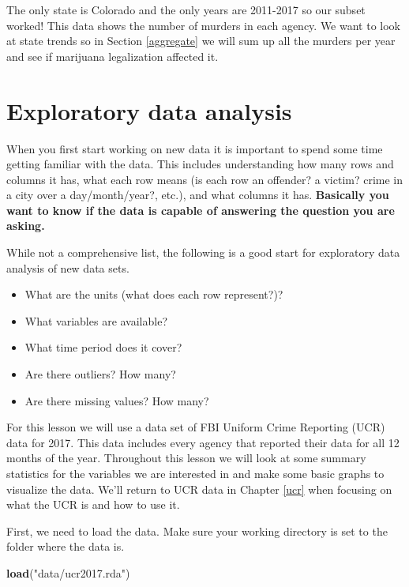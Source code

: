 \documentclass[
  12pt,
]{book}
\newenvironment{Shaded}{\begin{snugshade}}{\end{snugshade}}
\newcommand{\KeywordTok}[1]{\textcolor[rgb]{0.27,0.27,0.27}{\textbf{#1}}}
\newcommand{\NormalTok}[1]{#1}
\newcommand{\StringTok}[1]{\textcolor[rgb]{0.5,0.5,0.5}{#1}}
\providecommand{\tightlist}{%
  \setlength{\itemsep}{0pt}\setlength{\parskip}{0pt}}
\begin{document}
The only state is Colorado and the only years are 2011-2017 so our subset worked! This data shows the number of murders in each agency. We want to look at state trends so in Section \ref{aggregate} we will sum up all the murders per year and see if marijuana legalization affected it.

\hypertarget{explore}{%
\chapter{Exploratory data analysis}\label{explore}}

When you first start working on new data it is important to spend some time getting familiar with the data. This includes understanding how many rows and columns it has, what each row means (is each row an offender? a victim? crime in a city over a day/month/year?, etc.), and what columns it has. \textbf{Basically you want to know if the data is capable of answering the question you are asking.}

While not a comprehensive list, the following is a good start for exploratory data analysis of new data sets.

\begin{itemize}
\tightlist
\item
  What are the units (what does each row represent?)?
\item
  What variables are available?
\item
  What time period does it cover?
\item
  Are there outliers? How many?
\item
  Are there missing values? How many?
\end{itemize}

For this lesson we will use a data set of FBI Uniform Crime Reporting (UCR) data for 2017. This data includes every agency that reported their data for all 12 months of the year. Throughout this lesson we will look at some summary statistics for the variables we are interested in and make some basic graphs to visualize the data. We'll return to UCR data in Chapter \ref{ucr} when focusing on what the UCR is and how to use it.

First, we need to load the data. Make sure your working directory is set to the folder where the data is.

\begin{Shaded}
\begin{Highlighting}[]
\KeywordTok{load}\NormalTok{(}\StringTok{"data/ucr2017.rda"}\NormalTok{)}
\end{Highlighting}
\end{Shaded}
\end{document}
